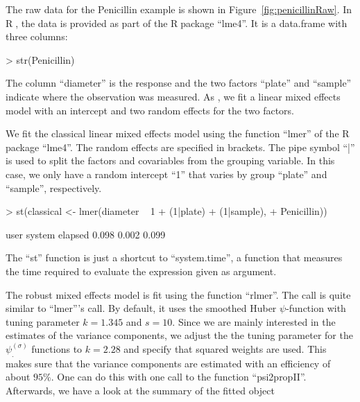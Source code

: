 \documentclass[11pt, a4paper]{article}
\newcommand*{\Rp}{\textsf{R}$\;$}
\newcommand{\s}[1][\rho]{#1^{(\sigma)}}
\renewenvironment{Schunk}{\vspace{\topsep}}{\vspace{\topsep}}
\theoremstyle{note}
\begin{document}
The raw data for the Penicillin example is shown in
Figure~\ref{fig:penicillinRaw}.  In \Rp, the data is provided as part of
the \Rp package ``lme4''. It is a data.frame with three columns:

\begin{Schunk}
\begin{Sinput}
> str(Penicillin)
\end{Sinput}
\end{Schunk}

The column ``diameter'' is the response and the two factors ``plate'' and
``sample'' indicate where the observation was measured. As
\citet{bates2011lme4}, we fit a linear mixed effects model with an
intercept and two random effects for the two factors.

We fit the classical linear mixed effects model using the function ``lmer''
of the \Rp package ``lme4''. The random effects are specified in
brackets. The pipe symbol ``|'' is used to split the factors and
covariables from the grouping variable. In this case, we only have a random
intercept ``1'' that varies by group ``plate'' and ``sample'',
respectively.

\begin{Schunk}
\begin{Sinput}
> st(classical <- lmer(diameter ~ 1 + (1|plate) + (1|sample),
+                      Penicillin))
\end{Sinput}
\end{Schunk}
\begin{Schunk}
\begin{Soutput}
   user  system elapsed 
  0.098   0.002   0.099 
\end{Soutput}
\end{Schunk}



The ``st'' function is just a shortcut to ``system.time'', a function that
measures the time required to evaluate the expression given as argument.

The robust mixed effects model is fit using the function ``rlmer''. The
call is quite similar to ``lmer'''s call. By default, it uses the smoothed Huber
$\psi$-function with tuning parameter $k=1.345$ and $s=10$. Since we are
mainly interested in the estimates of the variance components, we adjust
the the tuning parameter for the $\s[\psi]_.$ functions to $k = 2.28$ and
specify that squared weights are used. This makes sure that the variance
components are estimated with an efficiency of about $95\%$. One can do this
with one call to the function ``psi2propII''. Afterwards, we have a look
at the summary of the fitted object
\end{document}
